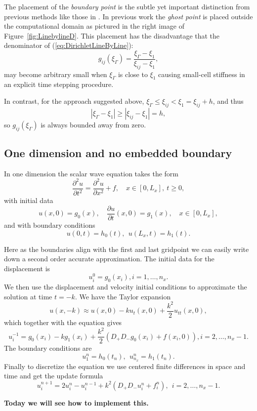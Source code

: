 \documentclass[11pt]{article}
\newcommand{\fig}[1]{\mbox{Figure{~#1}}}
\newcommand{\be}{\begin{equation}}
\newcommand{\ee}{\end{equation}}
\newcommand{\bd}{\begin{displaymath}}
\newcommand{\ed}{\end{displaymath}}
\newcommand{\pa}{\partial}
\newcommand{\f}{\frac}
\newcommand{\dpx}{D_+}
\newcommand{\dmx}{D_-}
\begin{document}
The placement of the \emph{boundary point} is the subtle yet important distinction from previous
methods like those in \cite{Kreiss_Petersson_2006,kreiss:1940,kreiss:1292}. In previous work the \emph{ghost point} is placed outside the
computational domain as pictured in the right image of \fig{\ref{fig:LinebylineD}}. This placement
has the disadvantage that the denominator of (\ref{eq:DirichletLineByLine}):
%
\bd
g_{ij}(\xi_\Gamma) = \f{\xi_\Gamma-\xi_{1}}{\xi_{ij}-\xi_{1}},
\ed
%
may become arbitrary small when $\xi_\Gamma$ is close to $\xi_{1}$ causing small-cell stiffness in
an explicit time stepping procedure.

In contrast, for the approach suggested above, $\xi_\Gamma \le \xi_{ij} < \xi_1 = \xi_{ij}+h$, and thus  
%
\bd
| \xi_\Gamma - \xi_1|  \ge | \xi_{ij} - \xi_1|  = h,
\ed  
%
so $g_{ij}(\xi_\Gamma)$ is always bounded away from zero. 

\subsection{One dimension and no embedded boundary}
In one dimension the scalar wave equation takes the form
%
\be \label{eq:weq1d} 
\f{\pa^2 u}{\pa t^2} =
\f{\pa^2 u}{\pa x^2} + f,\quad x \in [0,L_x],\ t\geq 0,
\ee 
%
with initial data 
%
\be \label{eq:weqid1d} 
u(x,0) = g_0(x), \quad \f{\pa u}{\pa t}(x,0) = g_1(x), \quad x \in [0,L_x],
\ee 
and with boundary conditions 
\be
u(0,t) = h_0(t), \ \ u(L_x,t) = h_1(t).
\ee

Here as the boundaries align with the first and last gridpoint we can easily write down a second order accurate approximation. The initial data for the displacement is
\[
u^0_{i} = g_0({x_i}),  i = 1,\ldots,n_x. 
\]
We then use the displacement and velocity initial conditions to approximate the solution at time $t = -k$. We have the Taylor expansion 
\[
	u(x,-k) \approx u(x,0) - k u_t(x,0) + \frac{k^2}{2} u_{tt}(x,0),
\]
which together with the equation gives 
\[
u^{-1}_{i} = g_0({x_i}) - k g_1({x_i}) +\frac{k^2}{2} \left( \dpx \dmx g_0(x_i)  + f(x_i,0) \right) ,  i = 2,\ldots,n_x-1. 
\]
The boundary conditions are
\[
u^n_{1} = h_0(t_n), \ \  u^n_{n_x} = h_1(t_n).
\]
Finally to discretize the equation we use centered finite differences in space and time and get the update formula
\be
u^{n+1}_i = 2u^n_i - u^{n-1}_i +k^2(\dpx \dmx u^n_i + f^n_i), \ \  i = 2,\ldots,n_x-1. 
\ee

{\bf Today we will see how to implement this.}














\end{document}
